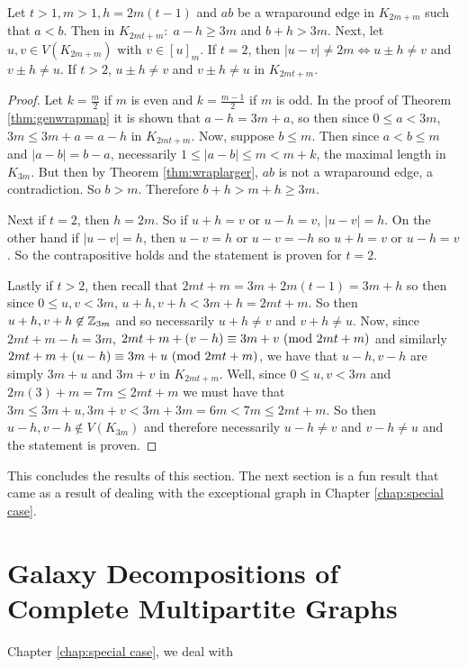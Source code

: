 \begin{corollary}\label{thm:gennewvertices}
    Let $t>1,m>1,h=2m(t-1)$ and $ab$ be a wraparound edge in $K_{2m+m}$ such that $a<b$. Then in $K_{2mt+m}:\;a-h\geq 3m$ and $b+h>3m$. Next, let $u,v\in V(K_{2m+m})$ with $v\in [u]_{m}$. If $t=2$, then $|u-v|\neq 2m\Longleftrightarrow u\pm h\neq v$ and $v\pm h \neq u$. If $t>2$, $u\pm h\neq v$ and $v\pm h\neq u$ in $K_{2mt+m}$.
\end{corollary}
\begin{proof}
    Let $k=\frac{m}{2}$ if $m$ is even and $k=\frac{m-1}{2}$ if $m$ is odd. In the proof of Theorem \ref{thm:genwrapmap} it is shown that $a-h=3m+a$, so then since $0\leq a<3m$, $3m\leq 3m+a=a-h$ in $K_{2mt+m}$. Now, suppose $b\leq m$. Then since $a<b\leq m$ and $|a-b|=b-a$, necessarily $1\leq |a-b|\leq m<m+k$, the maximal length in $K_{3m}$. But then by Theorem \ref{thm:wraplarger}, $ab$ is not a wraparound edge, a contradiction. So $b>m$. Therefore $b+h>m+h\geq 3m$.

    Next if $t=2$, then $h=2m$. So if $u+h = v$ or $u-h=v$, $|u-v|=h$. On the other hand if $|u-v|=h$, then $u-v=h$ or $u-v=-h$ so $u+h = v$ or $u-h=v$. So the contrapositive holds and the statement is proven for $t=2.$

    Lastly if $t>2$, then recall that $2mt+m=3m+2m(t-1)=3m+h$ so then since $0\leq u,v<3m$, $u+h,v+h<3m+h=2mt+m$. So then $u+h,v+h\not\in \mathbb{Z}_{3m}$ and so necessarily $u+h\neq v$ and $v+ h\neq u$. Now, since $2mt+m-h=3m$, $2mt+m+(v-h)\equiv 3m+v\ (\mathrm{mod}\ 2mt+m)$ and similarly $2mt+m+(u-h)\equiv 3m+u\ (\mathrm{mod}\ 2mt+m)$, we have that $u-h,v-h$ are simply $3m+u$ and $3m+v$ in $K_{2mt+m}$. Well, since $0\leq u,v<3m$ and $2m(3)+m=7m\leq 2mt+m$ we must have that $3m\leq 3m+u,3m+v<3m+3m=6m<7m\leq 2mt+m$. So then $u-h,v-h\not\in V(K_{3m})$ and therefore necessarily $u-h\neq v$ and $v-h\neq u$ and the statement is proven.

\end{proof}
    This concludes the results of this section. The next section is a fun result that came as a result of dealing with the exceptional graph in Chapter \ref{chap:special case}.

\section{Galaxy Decompositions of Complete Multipartite Graphs}

Chapter \ref{chap:special case}, we deal with





